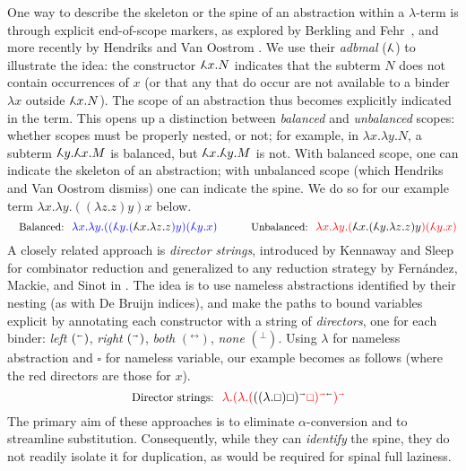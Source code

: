 \documentclass[a4paper,UKenglish,cleveref, autoref]{lipics-v2019}
\newcommand\adbmal{\reflectbox{$\lambda$}}
\newcommand\red{\color{red}}
\newcommand\blue{\color{blue}}
\newcommand\black{\color{black}}
\newcommand\dirL{{\scriptscriptstyle\shortleftarrow}}
\newcommand\dirR{{\scriptscriptstyle\shortrightarrow}}
\newcommand\dirRL{{\scriptscriptstyle\leftrightarrow}}
\newcommand\dirSTOP{{\scriptscriptstyle\bot}}
\newcommand\var{{\scriptstyle\square}}
\begin{document}
One way to describe the skeleton or the spine of an abstraction within a $\lambda$-term is through explicit end-of-scope markers, as explored by Berkling and Fehr~\cite{Berkling-Fehr-1982}, and more recently by Hendriks and Van Oostrom \cite{Hendriks-VanOostrom-2003}. We use their \emph{adbmal} ($\adbmal$) to illustrate the idea: the constructor $\adbmal x.N$ indicates that the subterm $N$ does not contain occurrences of $x$ (or that any that do occur are not available to a binder $\lambda x$ outside $\adbmal x.N$). The scope of an abstraction thus becomes explicitly indicated in the term. This opens up a distinction between \emph{balanced} and \emph{unbalanced} scopes: whether scopes must be properly nested, or not; for example, in $\lambda x.\lambda y.N$, a subterm $\adbmal y.\adbmal x.M$ is balanced, but $\adbmal x.\adbmal y.M$ is not. With balanced scope, one can indicate the skeleton of an abstraction; with unbalanced scope (which Hendriks and Van Oostrom dismiss) one can indicate the spine. We do so for our example term $\lambda x.\lambda y.((\lambda z.z)y)x$ below. 
%
\[
\text{\small Balanced:}
~~{\blue\lambda x. \lambda y. ((\adbmal y.({\black\adbmal x.\lambda z.z})y)(\adbmal y.x)}
\qquad
\text{\small Unbalanced:}
~~{\red\lambda x. \lambda y. ({\black\adbmal x. (\adbmal y.\lambda z.z)y})(\adbmal y.x)}
\]
%
A closely related approach is \emph{director strings}, introduced by Kennaway and Sleep \cite{Kennaway-Sleep-1988} for combinator reduction and generalized to any reduction strategy by Fern\'{a}ndez, Mackie, and Sinot in \cite{Fernandez-Mackie-Sinot-2005}. The idea is to use nameless abstractions identified by their nesting (as with De Bruijn indices), and make the paths to bound variables explicit by annotating each constructor with a string of \emph{directors}, one for each binder: \emph{left} $(^\dirL)$, \emph{right} $(^\dirR)$, \emph{both} $(^\dirRL)$, \emph{none} $(^\dirSTOP)$. Using $\lambda$ for nameless abstraction and $\var$ for nameless variable, our example becomes as follows (where the red directors are those for $x$).
\[
\text{\small Director strings:}~~\red\lambda.(\lambda.({\black((\lambda.\var)\var)^\dirR}\var)^{\dirR\black\dirL})^\dirR
\]
The primary aim of these approaches is to eliminate $\alpha$-conversion and to streamline substitution. Consequently, while they can \emph{identify} the spine, they do not readily isolate it for duplication, as would be required for spinal full laziness.
\end{document}
